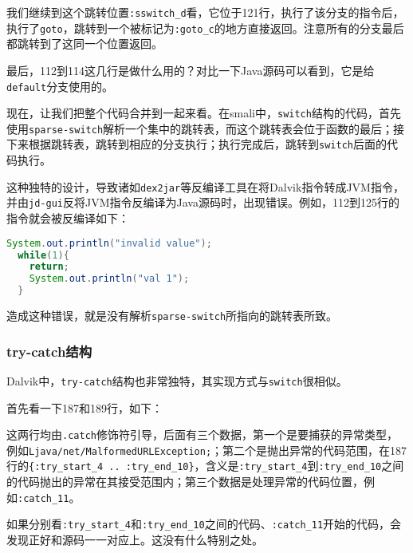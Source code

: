 我们继续到这个跳转位置\lstinline!:sswitch_d!看，它位于121行，执行了该分支的指令后，执行了\lstinline!goto!，跳转到一个被标记为\lstinline!:goto_c!的地方直接返回。注意所有的分支最后都跳转到了这同一个位置返回。

最后，112到114这几行是做什么用的？对比一下Java源码可以看到，它是给\lstinline!default!分支使用的。

现在，让我们把整个代码合并到一起来看。在smali中，\lstinline!switch!结构的代码，首先使用\lstinline!sparse-switch!解析一个集中的跳转表，而这个跳转表会位于函数的最后；接下来根据跳转表，跳转到相应的分支执行；执行完成后，跳转到\lstinline!switch!后面的代码执行。

这种独特的设计，导致诸如\lstinline!dex2jar!等反编译工具在将Dalvik指令转成JVM指令，并由\lstinline!jd-gui!反将JVM指令反编译为Java源码时，出现错误。例如，112到125行的指令就会被反编译如下：

\begin{lstlisting}[language=java, numbers=none]
  System.out.println("invalid value");
  while(1){
    return;
    System.out.println("val 1"); 
  }
\end{lstlisting}
造成这种错误，就是没有解析\lstinline!sparse-switch!所指向的跳转表所致。

\subsubsection{try-catch结构}



Dalvik中，\lstinline!try-catch!结构也非常独特，其实现方式与\lstinline!switch!很相似。

首先看一下187和189行，如下：


这两行均由\lstinline!.catch!修饰符引导，后面有三个数据，第一个是要捕获的异常类型，例如\lstinline!Ljava/net/MalformedURLException;!；第二个是抛出异常的代码范围，在187行的\lstinline!{:try_start_4 .. :try_end_10}!，含义是\lstinline!:try_start_4!到\lstinline!:try_end_10!之间的代码抛出的异常在其接受范围内；第三个数据是处理异常的代码位置，例如\lstinline!:catch_11!。

如果分别看\lstinline!:try_start_4!和\lstinline!:try_end_10!之间的代码、\lstinline!:catch_11!开始的代码，会发现正好和源码一一对应上。这没有什么特别之处。

